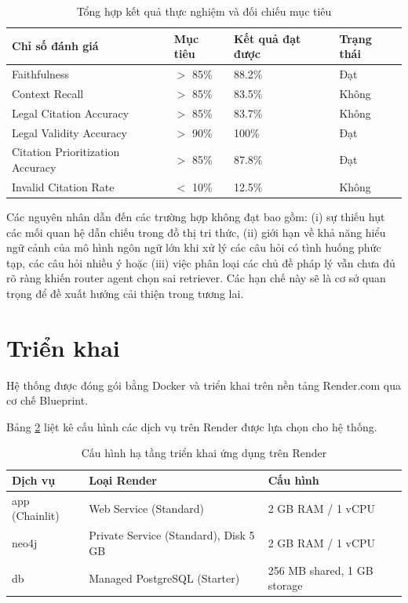 \documentclass[../DoAn.tex]{subfiles}
\begin{document}
\begin{table}[H]
\centering
\begin{tabular}{|l|l|l|l|}
\hline
\textbf{Chỉ số đánh giá} & \textbf{Mục tiêu} & \textbf{Kết quả đạt được} & \textbf{Trạng thái} \\ \hline
Faithfulness & $>$ 85\% & 88.2\% & Đạt \\ \hline
Context Recall & $>$ 85\% & 83.5\% & Không \\ \hline
Legal Citation Accuracy & $>$ 85\% & 83.7\% & Không \\ \hline
Legal Validity Accuracy & $>$ 90\% & 100\% & Đạt \\ \hline
Citation Prioritization Accuracy & $>$ 85\% & 87.8\% & Đạt \\ \hline
Invalid Citation Rate & $<$ 10\% & 12.5\% & Không \\ \hline
\end{tabular}
\caption{Tổng hợp kết quả thực nghiệm và đối chiếu mục tiêu}
\label{table:experimental_summary}
\end{table}

Các nguyên nhân dẫn đến các trường hợp không đạt bao gồm: (i) sự thiếu hụt các mối quan hệ dẫn chiếu trong đồ thị tri thức, (ii) giới hạn về khả năng hiểu ngữ cảnh của mô hình ngôn ngữ lớn khi xử lý các câu hỏi có tình huống phức tạp, các câu hỏi nhiều ý hoặc (iii) việc phân loại các chủ đề pháp lý vẫn chưa đủ rõ ràng khiến router agent chọn sai retriever. Các hạn chế này sẽ là cơ sở quan trọng để đề xuất hướng cải thiện trong tương lai.

\section{Triển khai}
Hệ thống được đóng gói bằng Docker và triển khai trên nền tảng Render.com qua cơ chế Blueprint. 

Bảng \ref{table:render_infra} liệt kê cấu hình các dịch vụ trên Render được lựa chọn cho hệ thống.

\begin{table}[H]
\centering
\small
\setlength{\tabcolsep}{6pt} %
\begin{tabularx}{\textwidth}{|p{3cm}|X|p{3.5cm}|}
\hline
\textbf{Dịch vụ} & \textbf{Loại Render} & \textbf{Cấu hình} \\ \hline
app (Chainlit) & Web Service (Standard) & 2 GB RAM / 1 vCPU \\ \hline
neo4j & Private Service (Standard), Disk 5 GB & 2 GB RAM / 1 vCPU \\ \hline
db & Managed PostgreSQL (Starter) & 256 MB shared, 1 GB storage \\ \hline
\end{tabularx}
\caption{Cấu hình hạ tầng triển khai ứng dụng trên Render}
\label{table:render_infra}
\end{table}
\end{document}

